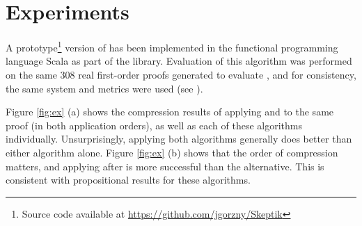 \section{Experiments} \label{sec:exp}
A prototype\footnote{Source code available at \url{https://github.com/jgorzny/Skeptik}} version of {\FORPI} has been implemented in the functional programming language Scala as part of the \skeptik
 library. %
Evaluation of this algorithm was performed on the same 308 real first-order proofs generated to evaluate {\GFOLU}, and for consistency, the same system and metrics were used (see \cite{GFOLU}).

Figure \ref{fig:ex} (a) shows the compression results of applying {\FORPI} and {\GFOLU} to the same proof (in both application orders), as well as each of these algorithms individually. Unsurprisingly, applying both algorithms generally does better than either algorithm alone. Figure \ref{fig:ex} (b) shows that the order of compression matters, and applying {\FORPI} after {\GFOLU} is more successful than the alternative. This is consistent with propositional results for these algorithms.




